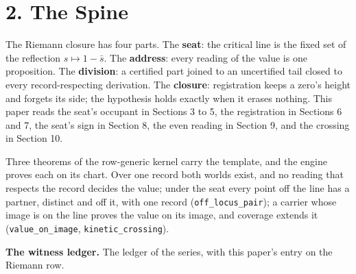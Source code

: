 \documentclass[10pt]{article}
\begin{document}
\hypertarget{the-spine}{%
\section{2. The Spine}\label{the-spine}}

The Riemann closure has four parts. The \textbf{seat}: the critical line
is the fixed set of the reflection \(s\mapsto1-\bar s\). The
\textbf{address}: every reading of the value is one proposition. The
\textbf{division}: a certified part joined to an uncertified tail closed
to every record-respecting derivation. The \textbf{closure}:
registration keeps a zero's height and forgets its side; the hypothesis
holds exactly when it erases nothing. This paper reads the seat's
occupant in Sections 3 to 5, the registration in Sections 6 and 7, the
seat's sign in Section 8, the even reading in Section 9, and the
crossing in Section 10.

Three theorems of the row-generic kernel carry the template, and the
engine proves each on its chart. Over one record both worlds exist, and
no reading that respects the record decides the value; under the seat
every point off the line has a partner, distinct and off it, with one
record (\texttt{off\_locus\_pair}); a carrier whose image is on the line
proves the value on its image, and coverage extends it
(\texttt{value\_on\_image}, \texttt{kinetic\_crossing}).

\textbf{The witness ledger.} The ledger of the series, with this paper's
entry on the Riemann row.

\begingroup\scriptsize
\end{document}
